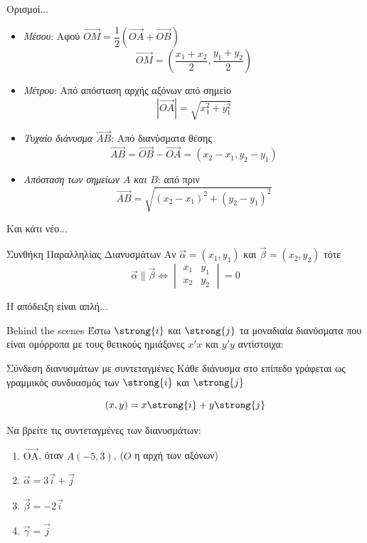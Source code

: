 \documentclass{presentation}
\begin{document}
\begin{frame}{Ορισμοί...}
  \begin{itemize}
    \item<1-> \emph{Μέσου}: Αφού $\overrightarrow{ΟΜ}=\dfrac{1}{2}\left( \overrightarrow{ΟΑ}+\overrightarrow{ΟΒ}\right)$
          $$\overrightarrow{ΟΜ}=\left(\dfrac{x_1+x_2}{2},\dfrac{y_1+y_2}{2}\right)$$
    \item<2-> \emph{Μέτρου}: Από απόσταση αρχής αξόνων από σημείο
          $$|\overrightarrow{ΟΑ}|=\sqrt{x_1^2+y_1^2}$$
    \item<3-> \emph{Τυχαίο διάνυσμα $\overrightarrow{ΑΒ}$}: Από διανύσματα θέσης
          $$\overrightarrow{ΑΒ}=\overrightarrow{ΟΒ}-\overrightarrow{ΟΑ}=(x_2-x_1,y_2-y_1)$$
    \item<4-> \emph{Aπόσταση των σημείων $Α$ και $Β$}: από πριν
          $$\overrightarrow{ΑΒ}=\sqrt{(x_2-x_1)^2+(y_2-y_1)^2}$$
  \end{itemize}
\end{frame}

\begin{frame}{Και κάτι νέο...}
  \begin{block}{Συνθήκη Παραλληλίας Διανυσμάτων}
    Αν $\vec{α}=(x_1,y_1)$ και $\vec{β}=(x_2,y_2)$ τότε
    $$\vec{α} 	\parallel \vec{β} \iff \begin{vmatrix}
        x_1 & y_1 \\
        x_2 & y_2
      \end{vmatrix}=0$$
  \end{block} \pause
  Η απόδειξη είναι απλή...
\end{frame}

\begin{frame}{Behind the scenes}
  Έστω $\strong{i}$ και $\strong{j}$ τα μοναδιαία διανύσματα που είναι ομόρροπα με τους θετικούς ημιάξονες $x'x$ και $y'y$ αντίστοιχα:
  \begin{block}{Σύνδεση διανυσμάτων με συντεταγμένες}
    Κάθε διάνυσμα στο επίπεδο γράφεται ως γραμμικός συνδυασμός των $\strong{i}$ και $\strong{j}$

    $$(x,y)=x\strong{i}+y\strong{j}$$
  \end{block}
\end{frame}

\exercises

\begin{askisi}
  Να βρείτε τις συντεταγμένες των διανυσμάτων:
  \begin{enumerate}
    \item $\vec{\text{OA}}$, όταν $A(-5, 3)$, ($O$ η αρχή των αξόνων)
    \item $\vec{\alpha} = 3\vec{i} + \vec{j}$
    \item $\vec{\beta} = -2\vec{i}$
    \item $\vec{\gamma} = \vec{j}$
  \end{enumerate}
\end{askisi}
\end{document}
